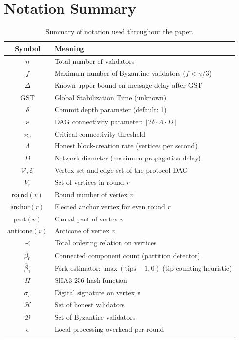 \documentclass[11pt,a4paper]{article}
\theoremstyle{definition}
\theoremstyle{remark}
\newcommand{\GST}{\mathrm{GST}}
\newcommand{\anticone}{\mathrm{anticone}}
\newcommand{\past}{\mathrm{past}}
\newcommand{\honest}{\mathcal{H}}
\newcommand{\byzantine}{\mathcal{B}}
\newcommand{\vertices}{\mathcal{V}}
\newcommand{\edges}{\mathcal{E}}
\newcommand{\round}{\mathsf{round}}
\newcommand{\anchor}{\mathsf{anchor}}
\newcommand{\order}{\prec}
\renewcommand{\kappa}{\varkappa}
\begin{document}
\section{Notation Summary}\label{app:notation}

\begin{table}[H]
\centering
\caption{Summary of notation used throughout the paper.}
\label{tab:notation}
\begin{tabular}{@{}cl@{}}
\toprule
\textbf{Symbol} & \textbf{Meaning} \\
\midrule
$n$ & Total number of validators \\
$f$ & Maximum number of Byzantine validators ($f < n/3$) \\
$\Delta$ & Known upper bound on message delay after $\GST$ \\
$\GST$ & Global Stabilization Time (unknown) \\
$\delta$ & Commit depth parameter (default: 1) \\
$\kappa$ & DAG connectivity parameter: $\lfloor 2\delta \cdot \Lambda \cdot D \rfloor$ \\
$\kappa_c$ & Critical connectivity threshold \\
$\Lambda$ & Honest block-creation rate (vertices per second) \\
$D$ & Network diameter (maximum propagation delay) \\
$\vertices, \edges$ & Vertex set and edge set of the protocol DAG \\
$V_r$ & Set of vertices in round $r$ \\
$\round(v)$ & Round number of vertex $v$ \\
$\anchor(r)$ & Elected anchor vertex for even round $r$ \\
$\past(v)$ & Causal past of vertex $v$ \\
$\anticone(v)$ & Anticone of vertex $v$ \\
$\order$ & Total ordering relation on vertices \\
$\beta_0$ & Connected component count (partition detector) \\
$\hat{\beta}_1$ & Fork estimator: $\max(\text{tips} - 1, 0)$ (tip-counting heuristic) \\
$H$ & SHA3-256 hash function \\
$\sigma_v$ & Digital signature on vertex $v$ \\
$\honest$ & Set of honest validators \\
$\byzantine$ & Set of Byzantine validators \\
$\epsilon$ & Local processing overhead per round \\
\bottomrule
\end{tabular}
\end{table}
\end{document}
